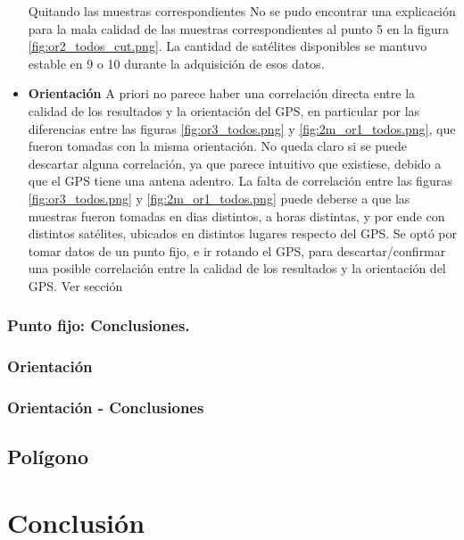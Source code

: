 \documentclass[spanish,12pt,a4paper,titlepage]{report}
\begin{document}
\begin{itemize}
Quitando las muestras correspondientes 
No se pudo encontrar una explicación para la mala calidad de las muestras correspondientes al punto 5 en la figura \ref{fig:or2_todos_cut.png}. La cantidad de satélites disponibles se mantuvo estable en 9 o 10 durante la adquisición de esos datos.
\item \textbf{Orientación}
A priori no parece haber una correlación directa entre la calidad de los resultados y la orientación del GPS, en particular por las diferencias entre las figuras \ref{fig:or3_todos.png} y \ref{fig:2m_or1_todos.png}, que fueron tomadas con la misma orientación.
No queda claro si se puede descartar alguna correlación, ya que parece intuitivo que existiese, debido a que el GPS tiene una antena adentro.
La falta de correlación entre las figuras \ref{fig:or3_todos.png} y \ref{fig:2m_or1_todos.png} puede deberse a que las muestras fueron tomadas en dias distintos, a horas distintas, y por ende con distintos satélites, ubicados en distintos lugares respecto del GPS. Se optó por tomar datos de un punto fijo, e ir rotando el GPS, para descartar/confirmar una posible correlación entre la calidad de los resultados y la orientación del GPS. Ver sección 
\end{itemize}




\subsubsection{Punto fijo: Conclusiones.}
\label{sec:gps2-punto-fijo-conclusiones}

\subsubsection{Orientación}
\label{sec:orientacion}


\subsubsection{Orientación - Conclusiones}
\label{sec:orientacion-conclusiones}


\newpage
\subsection{Polígono}
\label{sec:gps2-poligono}

% 

\newpage
\section{Conclusión}
\label{sec:conclusion}
\end{document}
